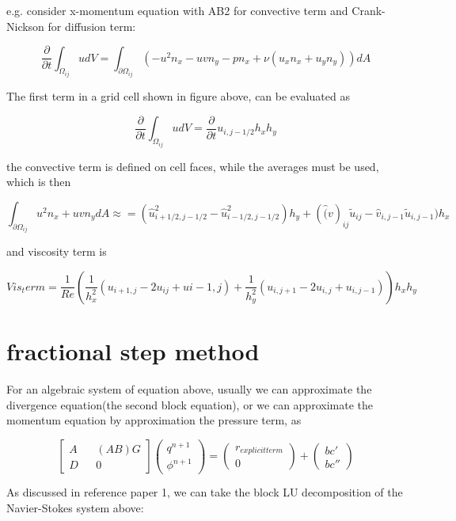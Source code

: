 \documentclass[11pt]{article}
\begin{document}
e.g. consider x-momentum equation with AB2 for convective term and Crank-Nickson for diffusion term:

$$ \frac{\partial}{\partial t} \int _{\Omega _{ij}} u dV = \int_{\partial \Omega_{ij}} ( -u^2 n_x - u v n_y - p n_x + \nu (u_x n_x + u_y n_y) ) dA  $$

The first term in a grid cell shown in figure above, can be evaluated as

$$  \frac{\partial}{\partial t} \int _{\Omega _{ij}} u dV = \frac{\partial}{\partial t} u_{i,j-1/2} h_x h_y $$

the convective term is defined on cell faces, while the averages must be used, which is then

$$  \int_{\partial \Omega_{ij}} u^2 n_x + u v n_y dA \approx = (\hat{u}_{i+1/2, j-1/2} ^ 2 - \hat{u}_{i-1/2, j-1/2}^2) h_y + ( \hat(v)_{ij} \tilde{u}_{ij} - \hat{v}_{i,j-1} \tilde{u}_{i,j-1}) h_x $$

and viscosity term is

$$ Vis_term = \frac{1}{Re}( \frac{1}{h_x^2} (u_{i+1,j} - 2u_{ij} + u{i-1,j}) + \frac{1}{h_y^2}( u_{i,j+1} - 2u_{i,j} + u_{i,j-1}) ) h_x h_y $$


\section{fractional step method}

For an algebraic system of equation above, usually we can approximate the divergence equation(the second block equation), or we can approximate the momentum equation by approximation the pressure term, as 

 $$ 
\begin{bmatrix} A &&  (AB)G \\ D &&  0 \end{bmatrix} \begin{pmatrix} q^{n+1} \\ \phi ^{n+1} \end{pmatrix} = \left( \begin{array}{c} r_{explicit term} \\ 0 \end{array} \right) + \left ( \begin{array}{c} bc' \\ bc'' \end{array} \right) $$


As discussed in reference paper 1, we can take the block LU decomposition of the Navier-Stokes system above:
\end{document}
